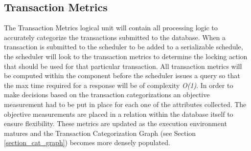 \documentclass[conference]{IEEEtran}
\begin{document}

\subsection{Transaction Metrics}
The Transaction Metrics logical unit will contain all processing logic to accurately categorize the transactions submitted to the database. When a transaction is submitted to the scheduler to be added to a serializable schedule, the scheduler will look to the transaction metrics to determine the locking action that should be used for that particular transaction. All transaction metrics will be computed within the component before the scheduler issues a query so that the max time required for a response will be of complexity \textit{O(1)}. In order to make decisions based on the transaction categorizations an objective measurement had to be put in place for each one of the attributes collected. The objective measurements are placed in a relation within the database itself to ensure flexibility. These metrics are updated as the execution environment matures and the Transaction Categorization Graph (see Section \ref{section_cat_graph}) becomes more densely populated. 
\end{document}

